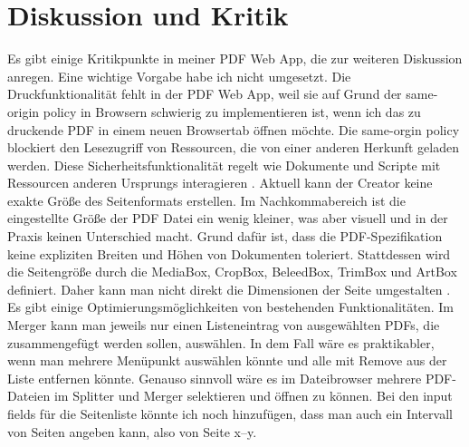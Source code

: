 \chapter{Diskussion und Kritik}
Es gibt einige Kritikpunkte in meiner PDF Web App, die zur weiteren Diskussion anregen. Eine wichtige Vorgabe habe ich nicht umgesetzt. Die Druckfunktionalität fehlt in der PDF Web App, weil sie auf Grund der same-origin policy in Browsern schwierig zu implementieren ist, wenn ich das zu druckende PDF in einem neuen Browsertab öffnen möchte. Die same-orgin policy blockiert den Lesezugriff von Ressourcen, die von einer anderen Herkunft geladen werden. Diese Sicherheitsfunktionalität regelt wie Dokumente und Scripte mit Ressourcen anderen Ursprungs interagieren \cite{same-origin}. Aktuell kann der Creator keine exakte Größe des Seitenformats erstellen. Im Nachkommabereich ist die eingestellte Größe der PDF Datei ein wenig kleiner, was aber visuell und in der Praxis keinen Unterschied macht. Grund dafür ist, dass die PDF-Spezifikation keine expliziten Breiten und Höhen von Dokumenten toleriert. Stattdessen wird die Seitengröße durch die MediaBox, CropBox, BeleedBox, TrimBox und ArtBox definiert. Daher kann man nicht direkt die Dimensionen der Seite umgestalten \cite{pdf-lib-pagesize}. Es gibt einige Optimierungsmöglichkeiten von bestehenden Funktionalitäten. Im Merger kann man jeweils nur einen Listeneintrag von ausgewählten PDFs, die zusammengefügt werden sollen, auswählen. In dem Fall wäre es praktikabler, wenn man mehrere Menüpunkt auswählen könnte und alle mit Remove aus der Liste entfernen könnte. Genauso sinnvoll wäre es im Dateibrowser mehrere PDF-Dateien im Splitter und Merger selektieren und öffnen zu können. Bei den input fields für die Seitenliste könnte ich noch hinzufügen, dass man auch ein Intervall von Seiten angeben kann, also von Seite x–y. 
\par
